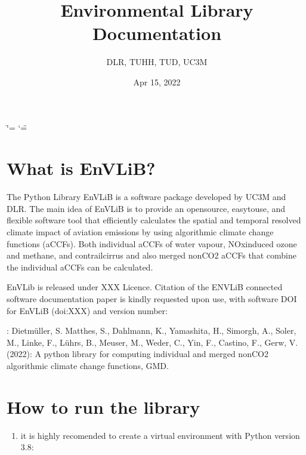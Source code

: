 \documentclass[a4paper,11pt,english]{sphinxmanual}
\title{Environmental Library Documentation}
\date{Apr 15, 2022}
\author{DLR, TUHH, TUD, UC3M}
\begin{document}
\ifdefined\shorthandoff
  \ifnum\catcode`\=\string=\active\shorthandoff{=}\fi
  \ifnum\catcode`\"=\active{}\fi
\fi

\pagestyle{empty}
\sphinxmaketitle
\pagestyle{plain}
\sphinxtableofcontents
\pagestyle{normal}
\label{\detokenize{index::doc}}



\chapter{What is EnVLiB?}
\label{\detokenize{index:what-is-envlib}}
The Python Library EnVLiB is a software package developed by UC3M and DLR. The main idea of EnVLiB is to provide an open\sphinxhyphen{}source, easy\sphinxhyphen{}to\sphinxhyphen{}use, and flexible software tool that efficiently calculates the spatial and temporal resolved climate impact of aviation emissions by using algorithmic climate change functions (aCCFs). Both individual aCCFs of water vapour, NOx\sphinxhyphen{}induced ozone and methane, and contrail\sphinxhyphen{}cirrus and also merged non\sphinxhyphen{}CO2 aCCFs that combine the individual aCCFs can be calculated.

EnVLib is released under XXX Licence. Citation of the ENVLiB connected software documentation paper is kindly requested upon use, with software DOI for EnVLiB (doi:XXX) and version number:

: Dietmüller, S. Matthes, S., Dahlmann, K., Yamashita, H., Simorgh, A., Soler, M., Linke, F., Lührs, B., Meuser, M., Weder, C., Yin, F., Castino, F., Gerw, V. (2022): A python library for computing individual and merged non\sphinxhyphen{}CO2 algorithmic climate change functions, GMD.


\chapter{How to run the library}
\label{\detokenize{index:how-to-run-the-library}}\begin{enumerate}
%
\setcounter{enumi}{-1}
\item {} 
it is highly recomended to create a virtual environment with Python version 3.8:

\end{enumerate}
\end{document}

